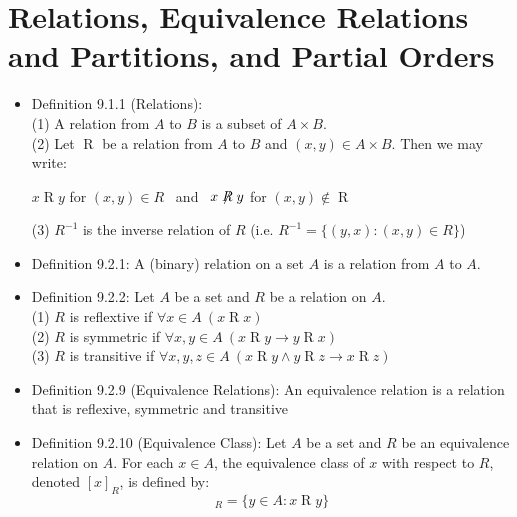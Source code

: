 \documentclass{article}
\begin{document}
\section*{Relations, Equivalence Relations and Partitions, and Partial Orders}
\begin{itemize}
    \item Definition 9.1.1 (Relations): 
        \\ \hspace*{3mm} (1) A relation from $A$ to $B$ is a subset of $A \times B$.
        \\ \hspace*{3mm} (2) Let $\mathrel{R}$ be a relation from $A$ to $B$ and $(x,y)\in A\times B$. Then we may write:
        \begin{center}
            $x \mathrel{R} y$ for $(x,y)\in R$ \ and \  $x \centernot{R} y$ for $(x, y) \not\in \mathrel{R}$\\
        \end{center}
        \hspace*{3mm} (3) $R^{-1}$ is the inverse relation of $R$ (i.e. $R^{-1}=\{(y,x):(x,y)\in R\}$)
    \item Definition 9.2.1: A (binary) relation on a set $A$ is a relation from $A$ to $A$.
    \item Definition 9.2.2: Let $A$ be a set and $R$ be a relation on $A$.
        \\ \hspace*{3mm} (1) $R$ is reflextive if $\forall x\in A\ (x \mathrel{R} x)$
        \\ \hspace*{3mm} (2) $R$ is symmetric if $\forall x,y\in A\ (x \mathrel{R} y \xrightarrow{} y \mathrel{R} x)$
        \\ \hspace*{3mm} (3) $R$ is transitive if $\forall x,y,z\in A\ (x \mathrel{R} y \land  y \mathrel{R} z \xrightarrow{} x \mathrel{R} z)$
    \item Definition 9.2.9 (Equivalence Relations): An equivalence relation is a relation that is reflexive, symmetric and transitive
    \item Definition 9.2.10 (Equivalence Class): Let $A$ be a set and $R$ be an equivalence relation on $A$. For each $x\in A$, the equivalence class of $x$ with respect to $R$, denoted $[x]_R$, is defined by:
        \begin{equation*}
            [x]_R=\{y\in A: x \mathrel{R} y\}

\end{equation*}
\end{itemize}
\end{document}

